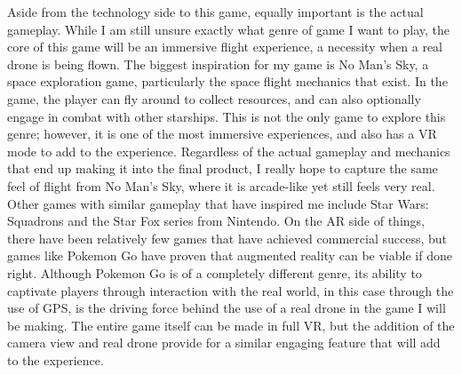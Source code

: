 \documentclass[10pt,twocolumn]{article}
\begin{document}
Aside from the technology side to this game, equally important is the actual gameplay. While I am still unsure exactly what genre of game I want to play, the core of this game will be an immersive flight experience, a necessity when a real drone is being flown. The biggest inspiration for my game is No Man's Sky, a space exploration game, particularly the space flight mechanics that exist. In the game, the player can fly around to collect resources, and can also optionally engage in combat with other starships. This is not the only game to explore this genre; however, it is one of the most immersive experiences, and also has a VR mode to add to the experience. Regardless of the actual gameplay and mechanics that end up making it into the final product, I really hope to capture the same feel of flight from No Man's Sky, where it is arcade-like yet still feels very real. Other games with similar gameplay that have inspired me include Star Wars: Squadrons and the Star Fox series from Nintendo. On the AR side of things, there have been relatively few games that have achieved commercial success, but games like Pokemon Go have proven that augmented reality can be viable if done right. Although Pokemon Go is of a completely different genre, its ability to captivate players through interaction with the real world, in this case through the use of GPS, is the driving force behind the use of a real drone in the game I will be making. The entire game itself can be made in full VR, but the addition of the camera view and real drone provide for a similar engaging feature that will add to the experience.


\printbibliography 
\end{document}
